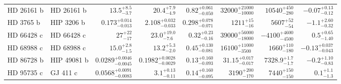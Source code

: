 \begin{longtable*}{llrrrrrr}
HD 26161 b & HD 26161 b & $13.5^{+8.5}_{-3.7}$ & $20.4^{+7.9}_{-4.9}$ & $0.82^{+0.061}_{-0.050}$ & $32000^{+21000}_{-10000}$ & $10540^{+450}_{-280}$ & $-0.07^{+0.13}_{-0.12}$ \\
HD 3765 b & HIP 3206 b & $0.173^{+0.014}_{-0.013}$ & $2.108^{+0.032}_{-0.033}$ & $0.298^{+0.078}_{-0.071}$ & $1211^{+15}_{-16}$ & $5607^{+52}_{-54}$ & $-1.1^{+2.60}_{-0.32}$ \\
HD 66428 c & HD 66428 c & $27^{+22}_{-17}$ & $23.0^{+19.0}_{-7.6}$ & $0.32^{+0.23}_{-0.16}$ & $39000^{+56000}_{-18000}$ & $-4100^{+4600}_{-4500}$ & $0.5^{+0.65}_{-1.40}$ \\
HD 68988 c & HD 68988 c & $15.0^{+2.8}_{-1.5}$ & $13.2^{+5.3}_{-2.0}$ & $0.45^{+0.130}_{-0.081}$ & $16100^{+11000}_{-3500}$ & $1660^{+110}_{-180}$ & $-0.13^{+0.037}_{-0.043}$ \\
HD 86728 b & HIP 49081 b & $0.0289^{+0.0046}_{-0.0045}$ & $0.1982^{+0.0028}_{-0.0029}$ & $0.13^{+0.160}_{-0.093}$ & $31.15^{+0.017}_{-0.017}$ & $7328.9^{+1.7}_{-1.7}$ & $-0.2^{+1.10}_{-0.83}$ \\
HD 95735 c & GJ 411 c & $0.0568^{+0.0091}_{-0.0083}$ & $3.1^{+0.13}_{-0.11}$ & $0.14^{+0.160}_{-0.095}$ & $3190^{+200}_{-170}$ & $7440^{+150}_{-150}$ & $0.1^{+1.1}_{-1.3}$ \\
\bottomrule
\end{longtable*}
